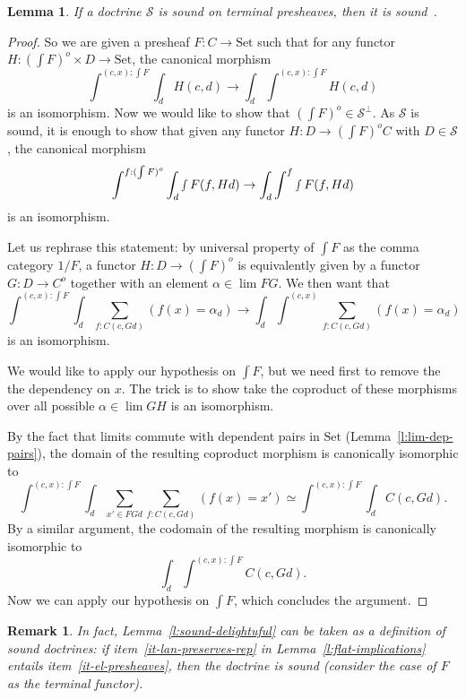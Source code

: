 \documentclass{article}
\newcommand{\Set}{\text{Set}}
\newtheorem{remark}[theorem]{Remark}
\newtheorem{lemma}[theorem]{Lemma}
\begin{document}
\begin{lemma}
  \label{l:sound-delightful}
  If a doctrine $\mathcal{S}$ is sound on terminal presheaves, then
  it is sound~\cite[Theorem 2.4]{lack_accessible}.
\end{lemma}
\begin{proof}
  So we are given a presheaf $F:C\rightarrow \Set$ such that 
  for any functor
  $H:(\int F)^o \times D \rightarrow \Set$, the 
  canonical morphism
  \[
    \int^{(c,x): \int F} \int_d H(c,d) \rightarrow
    \int_d \int^{(c,x): \int F}  H(c,d) 
  \]
  is an isomorphism.
  Now we would like to show that $(\int F)^o \in \mathcal{S}^\bot$. As
  $\mathcal{S}$ is sound, it is enough to show that given any functor
  $H:D \rightarrow (\int F)^oC $ with $D \in \mathcal{S}$, the 
  canonical morphism
  \[
    \int^{f: (\int F)^o} \int_d \smallint F (f, H d) \rightarrow
    \int_d \int^{f}  \smallint F(f, H d) 
  \]
  is an isomorphism.
  
  Let us rephrase this statement: by universal property
of $\int F$ as the comma category $1/F$,
  a functor 
  $H:D \rightarrow (\int F)^o $ is equivalently given by a functor
  $G : D \rightarrow C^o$ together with an element $\alpha \in \lim FG$.
  We then want that
  \[
    \int^{(c,x): \int F} \int_d  \sum_{f : C(c,G d)} (f(x)=\alpha_d) \rightarrow
    \int_d \int^{(c,x)}  \sum_{f : C(c,G d)} (f(x)=\alpha_d) 
  \]
  is an isomorphism.

  We would like to apply our hypothesis on $\int F$, but we need first to remove the
  the dependency on $x$. The trick is to show take the coproduct of these
  morphisms over all possible $\alpha\in \lim GH$ is an isomorphism.

  By the fact that limits commute with dependent pairs in $\Set$
  (Lemma~\ref{l:lim-dep-pairs}),
  the domain of the resulting coproduct morphism is canonically isomorphic to
\[
  \int^{(c,x): \int F} \int_d  \sum_{x' \in FGd}\sum_{f : C(c,G d)} (f(x)=x')
  \simeq
  \int^{(c,x): \int F} \int_d  C(c,G d).
  \]
  By a similar argument, the codomain of the resulting morphism is canonically
  isomorphic to
  \[
    \int_d \int^{(c,x): \int F}   C(c,G d).
  \]
Now we can apply our hypothesis on $\int F$, which concludes the argument.

  
\end{proof}
\begin{remark}
  In fact, Lemma~\ref{l:sound-delightuful} can be taken as a definition of sound
  doctrines: if 
  item~\ref{it-lan-preserves-rep} in Lemma~\ref{l:flat-implications} entails
  item~\ref{it-el-presheaves}, then the doctrine is sound (consider the case of
  $F$ as the terminal functor).
\end{remark}
\end{document}
